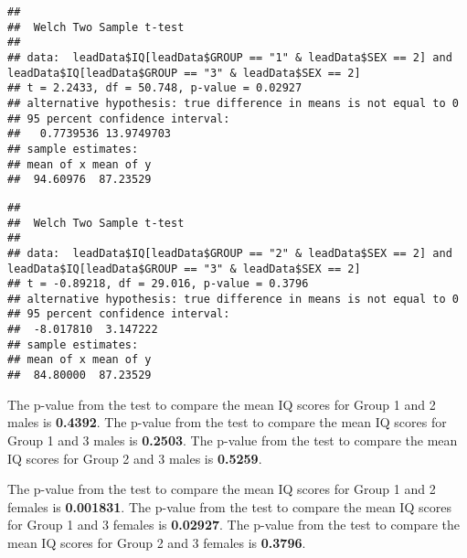 \documentclass[
]{article}
\newenvironment{Shaded}{\begin{snugshade}}{\end{snugshade}}
\newcommand{\DataTypeTok}[1]{\textcolor[rgb]{0.13,0.29,0.53}{#1}}
\newcommand{\DecValTok}[1]{\textcolor[rgb]{0.00,0.00,0.81}{#1}}
\newcommand{\KeywordTok}[1]{\textcolor[rgb]{0.13,0.29,0.53}{\textbf{#1}}}
\newcommand{\NormalTok}[1]{#1}
\newcommand{\OperatorTok}[1]{\textcolor[rgb]{0.81,0.36,0.00}{\textbf{#1}}}
\newcommand{\StringTok}[1]{\textcolor[rgb]{0.31,0.60,0.02}{#1}}
\begin{document}
\begin{verbatim}
## 
##  Welch Two Sample t-test
## 
## data:  leadData$IQ[leadData$GROUP == "1" & leadData$SEX == 2] and leadData$IQ[leadData$GROUP == "3" & leadData$SEX == 2]
## t = 2.2433, df = 50.748, p-value = 0.02927
## alternative hypothesis: true difference in means is not equal to 0
## 95 percent confidence interval:
##   0.7739536 13.9749703
## sample estimates:
## mean of x mean of y 
##  94.60976  87.23529
\end{verbatim}

\begin{Shaded}
\end{Shaded}

\begin{verbatim}
## 
##  Welch Two Sample t-test
## 
## data:  leadData$IQ[leadData$GROUP == "2" & leadData$SEX == 2] and leadData$IQ[leadData$GROUP == "3" & leadData$SEX == 2]
## t = -0.89218, df = 29.016, p-value = 0.3796
## alternative hypothesis: true difference in means is not equal to 0
## 95 percent confidence interval:
##  -8.017810  3.147222
## sample estimates:
## mean of x mean of y 
##  84.80000  87.23529
\end{verbatim}

The p-value from the test to compare the mean IQ scores for Group 1 and
2 males is \textbf{0.4392}. The p-value from the test to compare the
mean IQ scores for Group 1 and 3 males is \textbf{0.2503}. The p-value
from the test to compare the mean IQ scores for Group 2 and 3 males is
\textbf{0.5259}.

The p-value from the test to compare the mean IQ scores for Group 1 and
2 females is \textbf{0.001831}. The p-value from the test to compare the
mean IQ scores for Group 1 and 3 females is \textbf{0.02927}. The
p-value from the test to compare the mean IQ scores for Group 2 and 3
females is \textbf{0.3796}.
\end{document}
